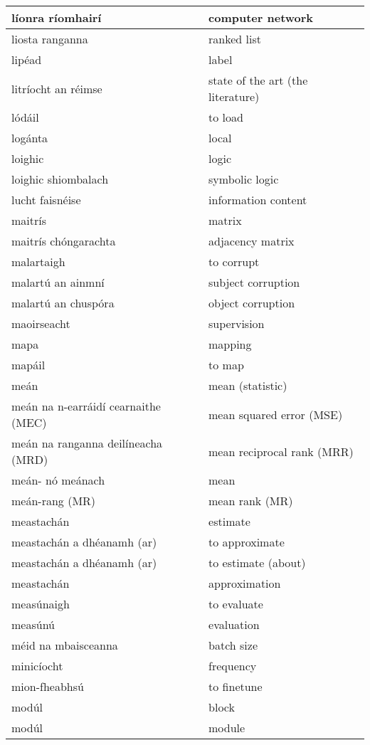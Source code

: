 \begin{longtable}{|l|l|}
		líonra ríomhairí&computer network\\ \hline 
		liosta ranganna&ranked list\\ \hline 
		lipéad&label\\ \hline 
		litríocht an réimse&state of the art (the literature)\\ \hline 
		lódáil&to load\\ \hline 
		logánta&local\\ \hline 
		loighic&logic\\ \hline 
		loighic shiombalach&symbolic logic\\ \hline 
		lucht faisnéise&information content\\ \hline 
		maitrís&matrix\\ \hline 
		maitrís chóngarachta&adjacency matrix\\ \hline 
		malartaigh&to corrupt\\ \hline 
		malartú an ainmní&subject corruption\\ \hline 
		malartú an chuspóra&object corruption\\ \hline 
		maoirseacht&supervision\\ \hline 
		mapa&mapping\\ \hline 
		mapáil&to map\\ \hline 
		meán&mean (statistic)\\ \hline 
		meán na n-earráidí cearnaithe (MEC)&mean squared error (MSE)\\ \hline 
		meán na ranganna deilíneacha (MRD)&mean reciprocal rank (MRR)\\ \hline 
		meán- nó meánach&mean\\ \hline 
		meán-rang (MR)&mean rank (MR)\\ \hline 
		meastachán&estimate\\ \hline 
		meastachán a dhéanamh (ar)&to approximate\\ \hline 
		meastachán a dhéanamh (ar)&to estimate (about)\\ \hline 
		meastachán&approximation\\ \hline 
		measúnaigh&to evaluate\\ \hline 
		measúnú&evaluation\\ \hline 
		méid na mbaisceanna&batch size\\ \hline 
		minicíocht&frequency\\ \hline 
		mion-fheabhsú&to finetune\\ \hline 
		modúl&block\\ \hline 
		modúl&module\\ \hline 

\end{longtable}

